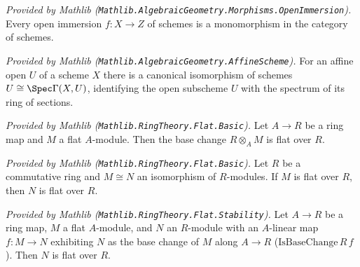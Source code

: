 \begin{lemma}
  \label{lem:mathlib_isOpenImmersion_mono}
  \mathlibok
  \textit{Provided by Mathlib (\texttt{Mathlib.AlgebraicGeometry.Morphisms.OpenImmersion}).}
  Every open immersion \(f : X \to Z\) of schemes is a monomorphism in the category of
  schemes.
\end{lemma}

\begin{lemma}
  \label{lem:mathlib_isAffineOpen_isoSpec}
  \mathlibok
  \textit{Provided by Mathlib (\texttt{Mathlib.AlgebraicGeometry.AffineScheme}).}
  For an affine open \(U\) of a scheme \(X\) there is a canonical isomorphism of schemes
  \(U \cong \Spec \Gamma(X, U)\), identifying the open subscheme \(U\) with the spectrum of
  its ring of sections.
\end{lemma}

\begin{lemma}
  \label{lem:mathlib_baseChange_flat}
  \mathlibok
  \textit{Provided by Mathlib (\texttt{Mathlib.RingTheory.Flat.Basic}).}
  Let \(A \to R\) be a ring map and \(M\) a flat \(A\)-module. Then the base change
  \(R \otimes_A M\) is flat over \(R\).
\end{lemma}

\begin{lemma}
  \label{lem:mathlib_flat_of_linearEquiv}
  \mathlibok
  \textit{Provided by Mathlib (\texttt{Mathlib.RingTheory.Flat.Basic}).}
  Let \(R\) be a commutative ring and \(M \cong N\) an isomorphism of \(R\)-modules. If
  \(M\) is flat over \(R\), then \(N\) is flat over \(R\).
\end{lemma}

\begin{lemma}
  \label{lem:mathlib_flat_isBaseChange}
  \mathlibok
  \textit{Provided by Mathlib (\texttt{Mathlib.RingTheory.Flat.Stability}).}
  Let \(A \to R\) be a ring map, \(M\) a flat \(A\)-module, and \(N\) an \(R\)-module with
  an \(A\)-linear map \(f : M \to N\) exhibiting \(N\) as the base change of \(M\) along
  \(A \to R\) (\(\mathrm{IsBaseChange}\,R\,f\)). Then \(N\) is flat over \(R\).
\end{lemma}

